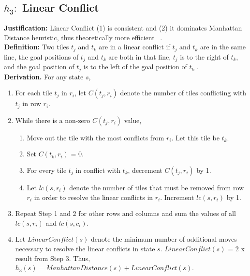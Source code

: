\documentclass[runningheads]{llncs}
\begin{document}
\subsection{ \(h_3: \) Linear Conflict}
\textbf{Justification:} Linear Conflict (1) is consistent and (2) it dominates Manhattan Distance heuristic, thus theoretically more efficient ~\cite[104]{stuart_russell_artifical_2010}. \\
\textbf{Definition:} Two tiles \( t_j \) and \( t_k \) are in a linear conflict if \( t_j \) and \( t_k \) are in the same line, 
the goal positions of \( t_j \) and \( t_k \) are both in that line, 
\( t_j \) is to the right of \( t_k \), and the goal position of \( t_j \) is to the left of the goal position of \( t_k \) \cite[p13]{othar_hansson_generating_1985}. \\
\textbf{Derivation.} For any state \( s \),
\begin{enumerate}
    \item For each tile \( t_j \) in \( r_i \), let \( C(t_j, r_i) \) denote the number of tiles conflicting with \( t_j \) in row \( r_i \).
    \item While there is a non-zero \( C(t_j, r_i) \) value, 
    \begin{enumerate}
        \item Move out the tile with the most conflicts from \( r_i \). Let this tile be \( t_k \).
        \item Set \( C(t_k, r_i) \) = 0.
        \item For every tile \( t_j \) in conflict with \( t_k \), decrement \( C(t_j, r_i) \) by 1.
        \item Let \( lc(s, r_i) \) denote the number of tiles that must be removed from row \( r_i \) in order to resolve the linear conflicts in \( r_i \). Increment \( lc(s, r_i) \) by 1.
    \end{enumerate}
    \item Repeat Step 1 and 2 for other rows and columns and sum the values of all \( lc (s, r_i) \) and \( lc(s, c_i) \).
    \item Let \( LinearConflict(s) \) denote the minimum number of additional moves necessary to resolve the linear conflicts in state \( s \). \( LinearConflict(s) \) = 2 x result from Step 3. Thus, \(h_3(s) = ManhattanDistance(s) + LinearConflict(s).\)
\end{enumerate}
\end{document}
